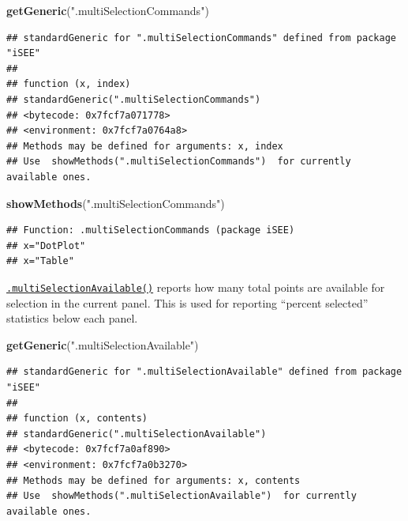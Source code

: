 \documentclass[
]{book}
\newenvironment{Shaded}{\begin{snugshade}}{\end{snugshade}}
\newcommand{\KeywordTok}[1]{\textcolor[rgb]{0.13,0.29,0.53}{\textbf{#1}}}
\newcommand{\NormalTok}[1]{#1}
\newcommand{\StringTok}[1]{\textcolor[rgb]{0.31,0.60,0.02}{#1}}
\begin{document}
\begin{Shaded}
\begin{Highlighting}[]
\KeywordTok{getGeneric}\NormalTok{(}\StringTok{".multiSelectionCommands"}\NormalTok{)}
\end{Highlighting}
\end{Shaded}

\begin{verbatim}
## standardGeneric for ".multiSelectionCommands" defined from package "iSEE"
## 
## function (x, index) 
## standardGeneric(".multiSelectionCommands")
## <bytecode: 0x7fcf7a071778>
## <environment: 0x7fcf7a0764a8>
## Methods may be defined for arguments: x, index
## Use  showMethods(".multiSelectionCommands")  for currently available ones.
\end{verbatim}

\begin{Shaded}
\begin{Highlighting}[]
\KeywordTok{showMethods}\NormalTok{(}\StringTok{".multiSelectionCommands"}\NormalTok{)}
\end{Highlighting}
\end{Shaded}

\begin{verbatim}
## Function: .multiSelectionCommands (package iSEE)
## x="DotPlot"
## x="Table"
\end{verbatim}

\href{https://isee.github.io/iSEE/reference/multi-select-generics.html}{\texttt{.multiSelectionAvailable()}} reports how many total points are available for selection in the current panel.
This is used for reporting ``percent selected'' statistics below each panel.

\begin{Shaded}
\begin{Highlighting}[]
\KeywordTok{getGeneric}\NormalTok{(}\StringTok{".multiSelectionAvailable"}\NormalTok{)}
\end{Highlighting}
\end{Shaded}

\begin{verbatim}
## standardGeneric for ".multiSelectionAvailable" defined from package "iSEE"
## 
## function (x, contents) 
## standardGeneric(".multiSelectionAvailable")
## <bytecode: 0x7fcf7a0af890>
## <environment: 0x7fcf7a0b3270>
## Methods may be defined for arguments: x, contents
## Use  showMethods(".multiSelectionAvailable")  for currently available ones.
\end{verbatim}
\end{document}
